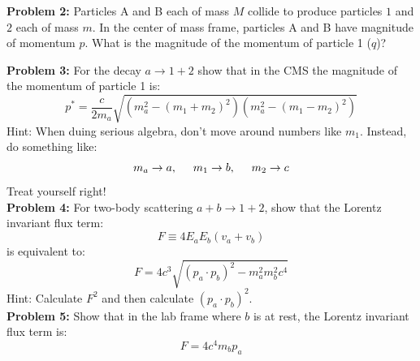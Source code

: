 \documentclass[12pt]{article}
\begin{document}
\noindent
{\bf Problem 2:}
Particles A and B each of mass $M$ collide to produce particles $1$
and $2$ each of mass $m$.  In the center of mass frame, particles A
and B have magnitude of momentum $p$.  What is the magnitude of the
momentum of particle 1 ($q$)?

\begin{center}
\end{center}

\newpage

\noindent
{\bf Problem 3:}
For the decay $a \to 1 + 2$ show that in the CMS the magnitude of the momentum of particle 1 is:
$$p^* = \frac{c}{2m_a}\sqrt{\left(m_a^2-(m_1 + m_2)^2\right)\left(m_a^2-(m_1 - m_2)^2\right)}$$
Hint:  When duing serious algebra, don't move around numbers like $m_1$.  Instead, do something like:
$$m_a \to a, \hspace{0.5cm} m_1 \to b, \hspace{0.5cm} m_2 \to c$$
Treat yourself right!\\[5pt]

\noindent
{\bf Problem 4:}
For two-body scattering $a + b \to 1 + 2$, show that the Lorentz invariant flux term:
$$F \equiv 4 E_a E_b (v_a + v_b)$$
is equivalent to:
$$F = 4 c^3 \sqrt{ (p_a \cdot p_b)^2 - m_a^2 m_b^2 c^4 } $$
Hint: Calculate $F^2$ and then calculate $(p_a \cdot p_b)^2$.\\[5pt]

\noindent
{\bf Problem 5:}
Show that in the lab frame where $b$ is at rest, the Lorentz invariant flux term is:
$$F = 4 c^4 m_b p_a$$\\[5pt]
\end{document}
